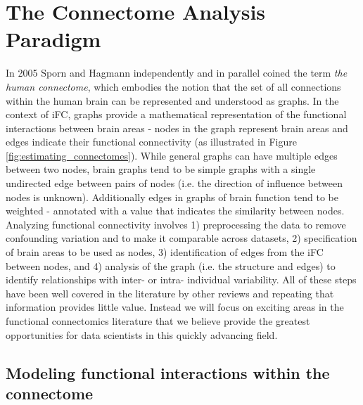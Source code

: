 \documentclass{bmcart}
\begin{document}
\section{The Connectome Analysis Paradigm}

In 2005 Sporn and Hagmann \cite{Sporns2005,Hagmann2005} independently and in parallel coined the term \textit{the human connectome}, which embodies the notion that the set of all connections within the human brain can be represented and understood as graphs. In the context of iFC, graphs provide a mathematical representation of the functional interactions between brain areas -  nodes in the graph represent brain areas and edges indicate their functional connectivity (as illustrated in Figure \ref{fig:estimating_connectomes}). While general graphs can have multiple edges between two nodes, brain graphs tend to be simple graphs with a single undirected edge between pairs of nodes (i.e. the direction of influence between nodes is unknown). Additionally edges in graphs of brain function tend to be weighted - annotated with a value that indicates the similarity between nodes. Analyzing functional connectivity involves 1) preprocessing the data to remove confounding variation and to make it comparable across datasets, 2) specification of brain areas to be used as nodes, 3) identification of edges from the iFC between nodes, and 4) analysis of the graph (i.e. the structure and edges) to identify relationships with inter- or intra- individual variability. All of these steps have been well covered in the literature by other reviews \cite{Craddock2013,Kelly2012,Varoquaux2013} and repeating that information provides little value. Instead we will focus on exciting areas in the functional connectomics literature that we believe provide the greatest opportunities for data scientists in this quickly advancing field.

\subsection{Modeling functional interactions within the connectome}
\end{document}
